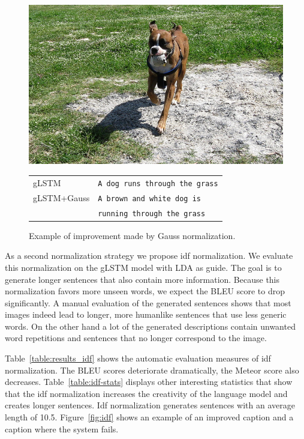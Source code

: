 \documentclass[twoside,twocolumn]{article}
\begin{document}
	\begin{figure}
		\centering
		\begin{minipage}[t]{.45\textwidth}
			\centering
			\vspace{0pt}
			\includegraphics[width=\textwidth]{Images/hond}
		\end{minipage}\hfill	
		\begin{minipage}[t]{.7\textwidth}
			\vspace{0pt}
			\begin{tabular}{ll}
				gLSTM & \texttt{A dog runs through the grass} \\
				gLSTM+Gauss & \texttt{A brown and white dog is}\\
				~ & \texttt{running through the grass} \\
			\end{tabular}
		\end{minipage}
		\caption{Example of improvement made by Gauss normalization.}
		\label{fig:gauss}
	\end{figure}
	
	As a second normalization strategy we propose idf normalization. We evaluate this normalization on the gLSTM model with LDA as guide. The goal is to generate longer sentences that also contain more information. Because this normalization favors more unseen words, we expect the BLEU score to drop significantly. A manual evaluation of the generated sentences shows that most images indeed lead to longer, more humanlike sentences that use less generic words. On the other hand a lot of the generated descriptions contain unwanted word repetitions and sentences that no longer correspond to the image.
	
	Table~\ref{table:results_idf} shows the automatic evaluation measures of idf normalization. The BLEU scores deteriorate dramatically, the Meteor score also decreases. Table~\ref{table:idf-stats} displays other interesting statistics that show that the idf normalization increases the creativity of the language model and creates longer sentences. Idf normalization generates sentences with an average length of 10.5. Figure~\ref{fig:idf} shows an example of an improved caption and a caption where the system fails.
	
\end{document}
